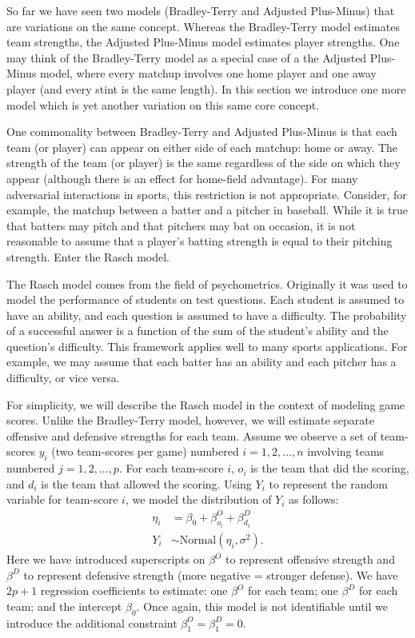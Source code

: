 \documentclass{article}
\begin{document}
  So far we have seen two models (Bradley-Terry and Adjusted Plus-Minus) that are variations on the same concept. Whereas the Bradley-Terry model estimates team strengths, the Adjusted Plus-Minus model estimates player strengths. One may think of the Bradley-Terry model as a special case of a the Adjusted Plus-Minus model, where every matchup involves one home player and one away player (and every stint is the same length). In this section we introduce one more model which is yet another variation on this same core concept.

  One commonality between Bradley-Terry and Adjusted Plus-Minus is that each team (or player) can appear on either side of each matchup: home or away. The strength of the team (or player) is the same regardless of the side on which they appear (although there is an effect for home-field advantage). For many adversarial interactions in sports, this restriction is not appropriate. Consider, for example, the matchup between a batter and a pitcher in baseball. While it is true that batters may pitch and that pitchers may bat on occasion, it is not reasonable to assume that a player's batting strength is equal to their pitching strength. Enter the Rasch model.

  The Rasch model comes from the field of psychometrics. Originally it was used to model the performance of students on test questions. Each student is assumed to have an ability, and each question is assumed to have a difficulty. The probability of a successful answer is a function of the sum of the student's ability and the question's difficulty. This framework applies well to many sports applications. For example, we may assume that each batter has an ability and each pitcher has a difficulty, or vice versa.

  For simplicity, we will describe the Rasch model in the context of modeling game scores. Unlike the Bradley-Terry model, however, we will estimate separate offensive and defensive strengths for each team. Assume we observe a set of team-scores $y_i$ (two team-scores per game) numbered $i = 1, 2, ..., n$ involving teams numbered $j = 1, 2, ..., p$. For each team-score $i$, $o_i$ is the team that did the scoring, and $d_i$ is the team that allowed the scoring. Using $Y_i$ to represent the random variable for team-score $i$, we model the distribution of $Y_i$ as follows:
  \begin{equation*}
    \begin{split}
      \eta_{i} &= \beta_0 + \beta^O_{o_i} + \beta^D_{d_i}\\
      Y_i &\sim \mbox{Normal}(\eta_i, \sigma^2).
    \end{split}
  \end{equation*}
  Here we have introduced superscripts on $\beta^O$ to represent offensive strength and $\beta^D$ to represent defensive strength (more negative = stronger defense). We have $2p + 1$ regression coefficients to estimate: one $\beta^O$ for each team; one $\beta^D$ for each team; and the intercept $\beta_0$. Once again, this model is not identifiable until we introduce the additional constraint $\beta^O_1 = \beta^D_1 = 0$.
  
\end{document}
